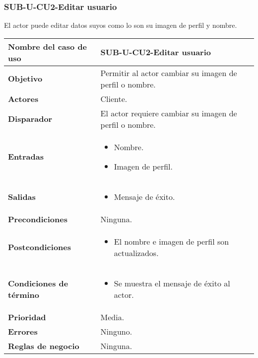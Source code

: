 \subsubsection{SUB-U-CU2-Editar usuario}\label{SUB-U-CU2}
El actor puede editar datos suyos como lo son su imagen de perfil y nombre.

\begin{longtable}{|J{5cm}|J{10.3cm}|}
	\hline
	\textbf{Nombre del caso de uso} &
		SUB-U-CU2-Editar usuario \\ \hline
	\textbf{Objetivo} &
		Permitir al actor cambiar su imagen de perfil o nombre. \\ \hline
	\textbf{Actores} &
		Cliente. \\ \hline 
	\textbf{Disparador} & 
		El actor requiere cambiar su imagen de perfil o nombre.\\ \hline 
	\textbf{Entradas} & 
		\begin{itemize}
				\item Nombre.
				\item Imagen de perfil.
		\end{itemize}\\ \hline 
	\textbf{Salidas} & 
		\begin{itemize}
			\item Mensaje de éxito.
		\end{itemize} \\ \hline
	\textbf{Precondiciones} &
		Ninguna.\\ \hline
	\textbf{Postcondiciones} &
		\begin{itemize}
			\item El nombre e imagen de perfil son actualizados.
		\end{itemize} \\ \hline
	\textbf{Condiciones de término} & 
		\begin{itemize}
			\item Se muestra el mensaje de éxito al actor.
		\end{itemize} \\ \hline 
	\textbf{Prioridad} & 
		Media. \\ \hline
	\textbf{Errores} & Ninguno.
		\\ \hline
	\textbf{Reglas de negocio} & Ninguna.
		 \\ \hline
\end{longtable}

